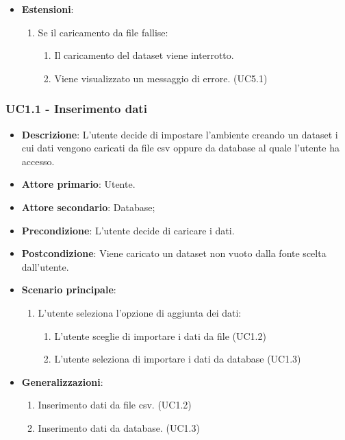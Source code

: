 \begin{itemize}
    \item \textbf{Estensioni}:
    \begin{enumerate}
        \item Se il caricamento da file fallise:
        \begin{enumerate}
            \item Il caricamento del dataset viene interrotto.
            \item Viene visualizzato un messaggio di errore. (UC5.1)
        \end{enumerate}
    \end{enumerate}
\end{itemize}

\subsubsection{UC1.1 - Inserimento dati}
\label{ssub:UC1.1}
\begin{itemize}
    \item \textbf{Descrizione}: L'utente decide di impostare l'ambiente creando un dataset i cui 
                                dati vengono caricati da file csv oppure da database al quale l'utente ha accesso.

    \item \textbf{Attore primario}: Utente.
    \item \textbf{Attore secondario}: Database;
    
    \item \textbf{Precondizione}:   L'utente decide di caricare i dati.

    \item \textbf{Postcondizione}:  Viene caricato un dataset non vuoto dalla fonte scelta dall'utente. 

	\item \textbf{Scenario principale}:
		\begin{enumerate}
			\item L'utente seleziona l'opzione di aggiunta dei dati:
            \begin{enumerate}
                \item L'utente sceglie di importare i dati da file (UC1.2)
                \item L'utente seleziona di importare i dati da database (UC1.3)
            \end{enumerate}
        \end{enumerate}

        \item \textbf{Generalizzazioni}:
        \begin{enumerate}
            \item Inserimento dati da file csv. (UC1.2)
            \item Inserimento dati da database. (UC1.3)
        \end{enumerate}
\end{itemize}


